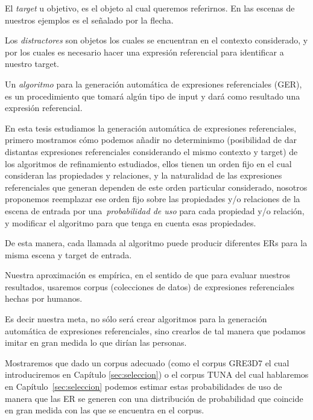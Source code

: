 El \emph{target} u objetivo, es el objeto al cual queremos referirnos. En las escenas de nuestros ejemplos es el se\~nalado por la flecha.

Los \emph{distractores} son objetos los cuales se encuentran en el contexto considerado, y por los cuales es necesario hacer una expresi\'on referencial para identificar a nuestro target. 

Un {\it algoritmo} para la generaci\'on autom\'atica de expresiones referenciales (GER), es un procedimiento que tomar\'a alg\'un tipo de input y dar\'a como resultado una expresi\'on referencial.

En esta tesis estudiamos la generaci\'on autom\'atica de expresiones referenciales, 
primero mostramos c\'omo podemos a\~nadir no determinismo (posibilidad de dar distantas expresiones referenciales considerando el mismo contexto y target) de los algoritmos de refinamiento estudiados, ellos tienen un orden fijo en el cual consideran las propiedades y relaciones, y la naturalidad de las expresiones referenciales que generan dependen de este orden particular considerado, nosotros proponemos reemplazar ese orden fijo
sobre las propiedades y/o relaciones de la escena de entrada por una~\emph{probabilidad de uso} para cada propiedad y/o relaci\'on, y modificar el algoritmo para que tenga en cuenta esas propiedades.

De esta manera, cada llamada al algoritmo puede producir diferentes ERs para la misma escena y target de entrada. 

Nuestra aproximaci\'on es emp\'irica, en el sentido de que para evaluar nuestros resultados, usaremos corpus (colecciones de datos) de expresiones referenciales hechas por humanos.

Es decir nuestra meta, no s\'olo ser\'a crear algoritmos para la generaci\'on autom\'atica de expresiones referenciales, sino crearlos de tal manera que podamos imitar en gran medida lo que dir\'ian las personas.

Mostraremos que dado un corpus adecuado (como el corpus GRE3D7 el cual introduciremos en Cap\'itulo \ref{sec:seleccion}) o el corpus TUNA del cual hablaremos en Cap\'itulo~\ref{sec:seleccion} podemos estimar estas probabilidades de uso de manera que las ER se generen con una distribuci\'on de probabilidad que coincide en gran medida con las que se encuentra en el corpus.


